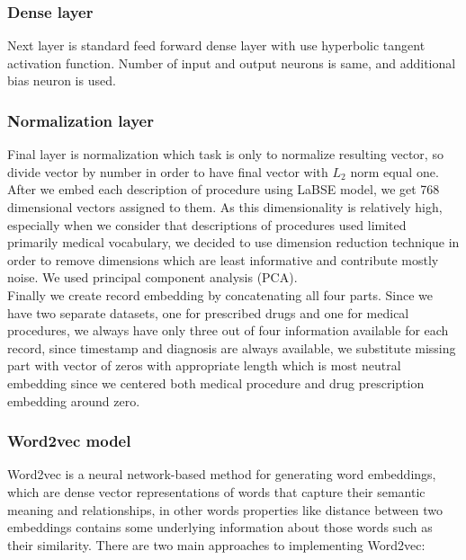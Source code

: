 \subsubsection{Dense layer}

Next layer is standard feed forward dense layer with use hyperbolic tangent activation function. Number of input and output neurons is same, and additional bias neuron is used.

\subsubsection{Normalization layer}

Final layer is normalization which task is only to normalize resulting vector, so divide vector by number in order to have final vector with $L_2$ norm equal one.
\\

After we embed each description of procedure using LaBSE model, we get 768 dimensional vectors assigned to them. As this dimensionality is relatively high, especially when we consider that descriptions of procedures used limited primarily medical vocabulary, we decided to use dimension reduction technique in order to remove dimensions which are least informative and contribute mostly noise. We used principal component analysis (PCA).
\\

Finally we create record embedding by concatenating all four parts. Since we have two separate datasets, one for prescribed drugs and one for medical procedures, we always have only three out of four information available for each record, since timestamp and diagnosis are always available, we substitute missing part with vector of zeros with appropriate length which is most neutral embedding since we centered both medical procedure and drug prescription embedding around zero.

\subsubsection{Word2vec model}

Word2vec is a neural network-based method for generating word embeddings, which are dense vector representations of words that capture their semantic meaning and relationships, in other words properties like distance between two embeddings contains some underlying information about those words such as their similarity. There are two main approaches to implementing Word2vec:

